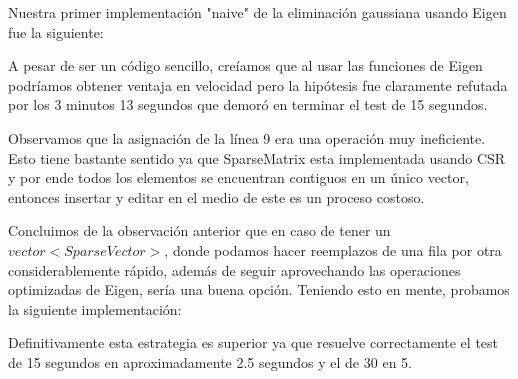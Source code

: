 Nuestra primer implementación "naive" de la eliminación gaussiana usando Eigen fue la siguiente:

\vspace{1em}


\vspace{1em}
A pesar de ser un código sencillo, creíamos que al usar las funciones de Eigen podríamos obtener ventaja en velocidad pero la hipótesis fue claramente refutada por los 3 minutos 13 segundos que demoró en terminar el test de 15 segundos.

\vspace{1em}
Observamos que la asignación de la línea 9 era una operación muy ineficiente. Esto tiene bastante sentido ya que SparseMatrix esta implementada usando CSR y por ende todos los elementos se encuentran contiguos en un único vector, entonces insertar y editar en el medio de este es un proceso costoso.
 
\vspace{1em}
Concluimos de la observación anterior que en caso de tener un $vector<SparseVector>$, donde podamos hacer reemplazos de una fila por otra considerablemente rápido, además de seguir aprovechando las operaciones optimizadas de Eigen, sería una buena opción. Teniendo esto en mente, probamos la siguiente implementación:

\vspace{1em}


\vspace{1em}
Definitivamente esta estrategia es superior ya que resuelve correctamente el test de 15 segundos en aproximadamente 2.5 segundos y el de 30 en 5.


% 


